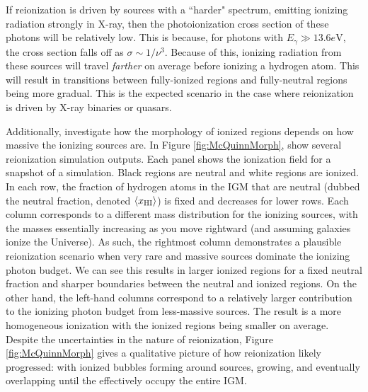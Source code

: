 If reionization is driven by sources with a ``harder" spectrum, emitting ionizing radiation strongly in X-ray, then the photoionization cross section of these photons will be relatively low. This is because, for photons with $E_{\gamma} \gg 13.6e\text{V}$, the cross section falls off as $\sigma \sim 1/\nu^3$. Because of this, ionizing radiation from these sources will travel \textit{farther} on average before ionizing a hydrogen atom. This will result in transitions between fully-ionized regions and fully-neutral regions being more gradual. This is the expected scenario in the case where reionization is driven by X-ray binaries or quasars. 


Additionally, \cite{McQuinn2007} investigate how the morphology of ionized regions depends on how massive the ionizing sources are. In Figure \ref{fig:McQuinnMorph}, \cite{McQuinn2007} show several reionization simulation outputs. Each panel shows the ionization field for a snapshot of a simulation. Black regions are neutral and white regions are ionized. In each row, the fraction of hydrogen atoms in the IGM that are neutral (dubbed the neutral fraction, denoted $\langle x_{\text{HI}}\rangle$) is fixed and decreases for lower rows. Each column corresponds to a different mass distribution for the ionizing sources, with the masses essentially increasing as you move rightward (and assuming galaxies ionize the Universe). As such, the rightmost column demonstrates a plausible reionization scenario when very rare and massive sources dominate the ionizing photon budget. We can see this results in larger ionized regions for a fixed neutral fraction and sharper boundaries between the neutral and ionized regions. On the other hand, the left-hand columns correspond to a relatively larger contribution to the ionizing photon budget from less-massive sources. The result is a more homogeneous ionization with the ionized regions being smaller on average. Despite the uncertainties in the nature of reionization, Figure \ref{fig:McQuinnMorph} gives a qualitative picture of how reionization likely progressed: with ionized bubbles forming around sources, growing, and eventually overlapping until the effectively occupy the entire IGM. 



